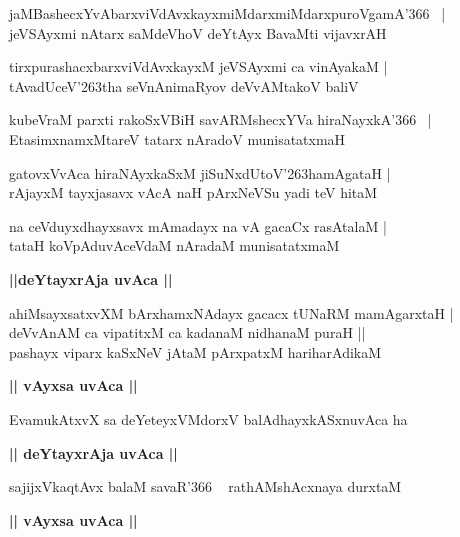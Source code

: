 \documentclass[twoside,12pt,openright]{book}
\def\S{\char'263}
\newcounter{shloka}[chapter]
\def\uvaca#1{\centerline{{\large\textbf{#1}}}}
\begin{document}
\begin{shloka}%
jaMBashecxYvAbarxviVdAvxkayxmiMdarxmiMdarxpuroVgamA\char'366 ~|\\
jeVSAyxmi nAtarx saMdeVhoV deYtAyx BavaMti vijavxrAH 
\end{shloka}

\begin{shloka}%
tirxpurashacxbarxviVdAvxkayxM jeVSAyxmi ca vinAyakaM |\\
tAvadUceV\S tha seVnAnimaRyov deVvAMtakoV baliV 
\end{shloka}

\begin{shloka}%
kubeVraM parxti rakoSxVBiH savARMshecxYVa hiraNayxkA\char'366 ~|\\
EtasimxnamxMtareV tatarx nAradoV munisatatxmaH 
\end{shloka}

\begin{shloka}%
gatovxVvAca hiraNAyxkaSxM jiSuNxdUtoV\S hamAgataH |\\
rAjayxM tayxjasavx vAcA naH pArxNeVSu yadi teV hitaM 
\end{shloka}

\begin{shloka}%
na ceVduyxdhayxsavx mAmadayx na vA gacaCx rasAtalaM |\\
tataH koVpAduvAceVdaM nAradaM munisatatxmaM 
\end{shloka}

\uvaca{||deYtayxrAja uvAca ||}

\begin{shloka}%
ahiMsayxsatxvXM bArxhamxNAdayx gacacx tUNaRM mamAgarxtaH |\\
deVvAnAM ca vipatitxM ca kadanaM nidhanaM puraH ||\\
pashayx viparx kaSxNeV jAtaM pArxpatxM hariharAdikaM 
\end{shloka}

\uvaca{|| vAyxsa uvAca ||}

\begin{shloka}%
EvamukAtxvX sa deYeteyxVMdorxV balAdhayxkASxnuvAca ha 
\end{shloka}

\uvaca{|| deYtayxrAja uvAca ||}

\begin{shloka}%
sajijxVkaqtAvx balaM savaR\char'366 ~ rathAMshAcxnaya durxtaM 
\end{shloka}

\uvaca{|| vAyxsa uvAca ||}
\end{document}
